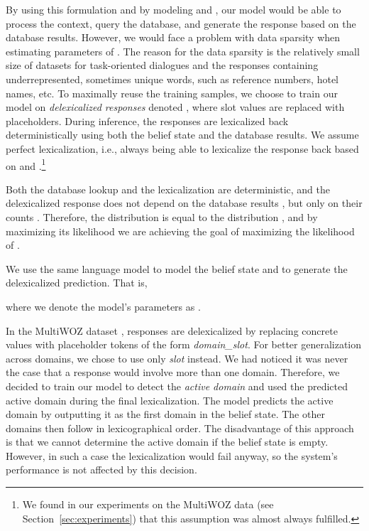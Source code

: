 \documentclass[11pt,a4paper]{article}
\begin{document}
By using this formulation and by modeling  and , our model would be able to process the context, query the database, and generate the response based on the database results. However, we would face a problem with data sparsity when estimating parameters of . The reason for the data sparsity is the relatively small size of datasets for task-oriented dialogues and the responses containing underrepresented, sometimes unique words, such as reference numbers, hotel names, etc. To maximally reuse the training samples, we choose to train our model on \emph{delexicalized responses} \cite{wen2015} denoted , where slot values are replaced with placeholders. During inference, the responses are lexicalized back deterministically using both the belief state and the database results. We assume perfect lexicalization, i.e., always being able to lexicalize the response  back based on  and .\footnote{We found in our experiments on the MultiWOZ data (see Section~\ref{sec:experiments}) that this assumption was almost always fulfilled.}


Both the database lookup and the lexicalization are deterministic, and the delexicalized response  does not depend on the database results , but only on their counts . Therefore, the distribution  is equal to the distribution , and by maximizing its likelihood we are achieving the goal of maximizing the likelihood of .

We use the same language model  to model the belief state and to generate the delexicalized prediction. That is,

where we denote the model's parameters as .

In the MultiWOZ dataset \cite[see Section~\ref{sec:experiments}]{budzianowski2018,eric2019}, responses are delexicalized by replacing concrete values with placeholder tokens of the form \textit{domain\_slot}. For better generalization across domains, we chose to use only \textit{slot} instead. We had noticed it was never the case that a response would involve more than one domain. Therefore, we decided to train our model to detect the \textit{active domain} and used the predicted active domain during the final lexicalization. The model predicts the active domain by outputting it as the first domain in the belief state. The other domains then follow in lexicographical order. The disadvantage of this approach is that we cannot determine the active domain if the belief state is empty. However, in such a case the lexicalization would fail anyway, so the system's performance is not affected by this decision.
\end{document}
